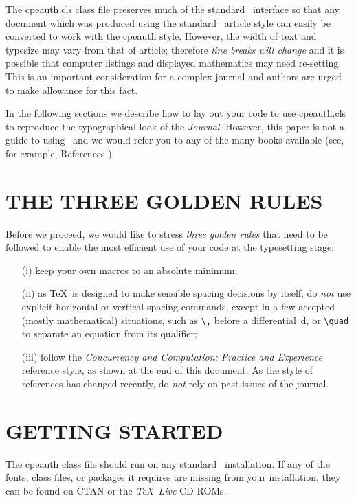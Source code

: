\documentclass{cpeauth}
\begin{document}
The \textsf{cpeauth.cls} class file preserves much of the standard
\LaTeXe\ interface so that any document which was produced using
the standard \LaTeXe\ \textsf{article} style can easily be converted
to work with the \textsf{cpeauth} style.
However, the width of text and typesize
may vary from that of \textsf{article}; therefore
\emph{line breaks will change} and it is possible
that computer listings and displayed mathematics may need re-setting.
This is an important consideration for a complex journal
and authors are urged to make allowance for this fact.

In the following sections we describe how to lay out your code to use
\textsf{cpeauth.cls} to reproduce the typographical look of the \emph{Journal}.
However, this paper is not a guide to using \LaTeXe\ and we would refer you
to any of the many books available
(see, for example, References \cite{Companion,KopkaDaly,Lamport}).

\section{THE THREE GOLDEN RULES}
Before we proceed, we would like to stress \emph{three golden rules}
that need to be followed to enable the most efficient use of your code
at the typesetting stage:
\begin{enumerate}
\item[(i)]
keep your own macros to an absolute minimum;
\item[(ii)]
as \TeX\ is designed to make sensible spacing decisions by itself,
do \emph{not} use explicit horizontal or vertical spacing commands,
except in a few accepted (mostly mathematical) situations, such as
\verb"\," before a differential~d,
or \verb"\quad" to separate an equation from its qualifier;
\item[(iii)]
follow the \emph{Concurrency and Computation: Practice and Experience} reference style,
as shown at the end of this document. As the style of references has
changed recently, do \emph{not} rely on past issues of the journal.
\end{enumerate}

\section{GETTING STARTED}
The \textsf{cpeauth} class file
should run on any standard \LaTeXe\ installation.
If any of the fonts, class files, or packages it requires
are missing from your installation, they can be found on
CTAN or the \emph{\TeX\ Live} CD-ROMs.
\end{document}
